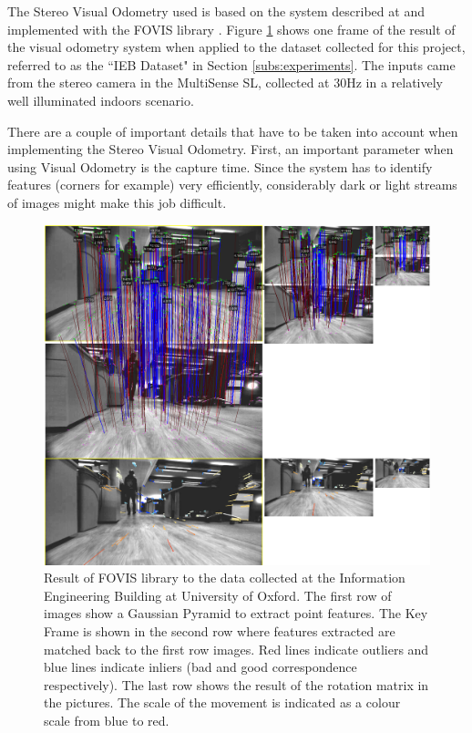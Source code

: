 \documentclass[11pt]{article}
\begin{document}
The Stereo Visual Odometry used is based on the system described at \cite{VisualOdometry} and implemented with the FOVIS library \cite{fovis}. Figure \ref{fig:VisualOdometry1} shows one frame of the result of the visual odometry system when applied to the dataset collected for this project, referred to as the ``IEB Dataset" in Section \ref{subs:experiments}. The inputs came from the stereo camera in the MultiSense SL, collected at 30Hz in a relatively well illuminated indoors scenario.
	
There are a couple of important details that have to be taken into account when implementing the Stereo Visual Odometry. First, an important parameter when using Visual Odometry is the capture time. Since the system has to identify features (corners for example) very efficiently, considerably dark or light streams of images might make this job difficult.  
	
	\begin{figure}
		\begin{minipage}{0.65\textwidth}
			\centering
			\includegraphics[width=\textwidth]{VisualOdometry1}
		\end{minipage} \hfill
		\begin{minipage}{0.35\textwidth}
			\centering
			\caption[t]{Result of FOVIS library to the data collected at the Information Engineering Building at University of Oxford. The first row of images show a Gaussian Pyramid to extract point features. The Key Frame is shown in the second row where features extracted are matched back to the first row images. Red lines indicate outliers and blue lines indicate inliers (bad and good correspondence respectively). The last row shows the result of the rotation matrix in the pictures. The scale of the movement is indicated as a colour scale from blue to red.}
			\label{fig:VisualOdometry1}	
		\end{minipage}				
	\end{figure}
\end{document}
